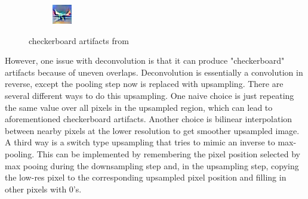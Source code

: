 \begin{figure}[h]
\begin{subfigure}{0.25\textwidth}
    \end{subfigure}
    \begin{subfigure}{0.25\textwidth}
    \includegraphics[width=0.9\linewidth]{lectures/05-a/checkerboard2.png}
    \end{subfigure}
    \caption{checkerboard artifacts from \citep{odena2016deconvolution}}
    \label{fig:checkerboard}
\end{figure}

However, one issue with deconvolution is that it can produce "checkerboard" artifacts because of uneven overlaps. Deconvolution is essentially a convolution in reverse, except the pooling step now is replaced with upsampling. There are several different ways to do this upsampling. One naive choice is just repeating the same value over all pixels in the upsampled region, which can lead to aforementioned checkerboard artifacts. Another choice is bilinear interpolation between nearby pixels at the lower resolution to get smoother upsampled image. A third way is a switch type upsampling that tries to mimic an inverse to max-pooling. This can be implemented by remembering the pixel position selected by max pooing during the downsampling step and, in the upsampling step, copying the low-res pixel to the corresponding upsampled pixel position and filling in other pixels with 0's.


